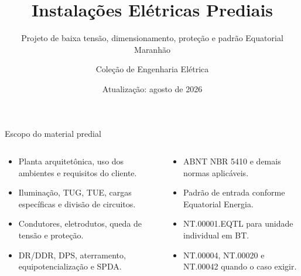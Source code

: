\documentclass[11pt,aspectratio=169]{beamer}
\title{Instalações Elétricas Prediais}
\subtitle{Projeto de baixa tensão, dimensionamento, proteção e padrão Equatorial Maranhão}
\author{Coleção de Engenharia Elétrica}
\institute{Material teórico — Predial}
\date{Atualização: agosto de 2026}
\begin{document}
{\begin{frame}\titlepage\end{frame}}

\begin{frame}{Escopo do material predial}\small
\begin{columns}[T,onlytextwidth]
\begin{caixaNorma}[title=Do levantamento ao projeto]\begin{itemize}
\item Planta arquitetônica, uso dos ambientes e requisitos do cliente.
\item Iluminação, TUG, TUE, cargas específicas e divisão de circuitos.
\item Condutores, eletrodutos, queda de tensão e proteção.
\item DR/DDR, DPS, aterramento, equipotencialização e SPDA.
\end{itemize}\end{caixaNorma}
\begin{caixaProjeto}[title=Aplicação no Maranhão]\begin{itemize}
\item ABNT NBR 5410 e demais normas aplicáveis.
\item Padrão de entrada conforme Equatorial Energia.
\item NT.00001.EQTL para unidade individual em BT.
\item NT.00004, NT.00020 e NT.00042 quando o caso exigir.
\end{itemize}\end{caixaProjeto}\end{columns}
\end{frame}















\end{document}
